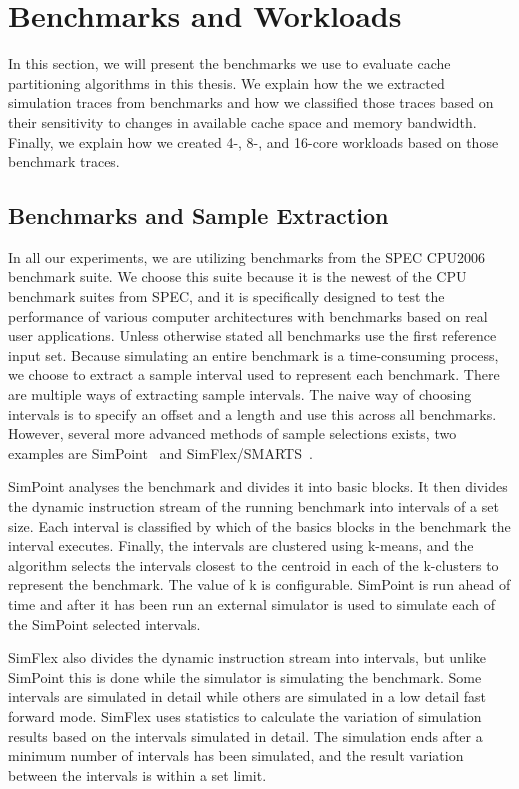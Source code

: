 
\section{Benchmarks and Workloads}
\label{sec:methodology:benchmarks}

In this section, we will present the benchmarks we use to evaluate cache partitioning algorithms in this thesis.
We explain how the we extracted simulation traces from benchmarks and how we classified those traces based on their sensitivity to changes in available cache space and memory bandwidth. 
Finally, we explain how we created 4-, 8-, and 16-core workloads based on those benchmark traces.

\subsection{Benchmarks and Sample Extraction}
\label{sec:methodology:benchmarks:benchmarks}

In all our experiments, we are utilizing benchmarks from the SPEC CPU2006~\cite{SPECCPU2006} benchmark suite. 
We choose this suite because it is the newest of the CPU benchmark suites from SPEC, and it is specifically designed to test the performance of various computer architectures with benchmarks based on real user applications.
Unless otherwise stated all benchmarks use the first reference input set.
Because simulating an entire benchmark is a time-consuming process, we choose to extract a sample interval used to represent each benchmark.
There are multiple ways of extracting sample intervals.
The naive way of choosing intervals is to specify an offset and a length and use this across all benchmarks.
However, several more advanced methods of sample selections exists, two examples are SimPoint~\cite{Hamerly2005} and SimFlex/SMARTS~\cite{Hardavellas2004, Wunderlich2003}.

SimPoint analyses the benchmark and divides it into basic blocks.
It then divides the dynamic instruction stream of the running benchmark into intervals of a set size.
Each interval is classified by which of the basics blocks in the benchmark the interval executes.
Finally, the intervals are clustered using k-means, and the algorithm selects the intervals closest to the centroid in each of the k-clusters to represent the benchmark.
The value of k is configurable.
SimPoint is run ahead of time and after it has been run an external simulator is used to simulate each of the SimPoint selected intervals.

SimFlex also divides the dynamic instruction stream into intervals, but unlike SimPoint this is done while the simulator is simulating the benchmark.
Some intervals are simulated in detail while others are simulated in a low detail fast forward mode.
SimFlex uses statistics to calculate the variation of simulation results based on the intervals simulated in detail.
The simulation ends after a minimum number of intervals has been simulated, and the result variation between the intervals is within a set limit.

